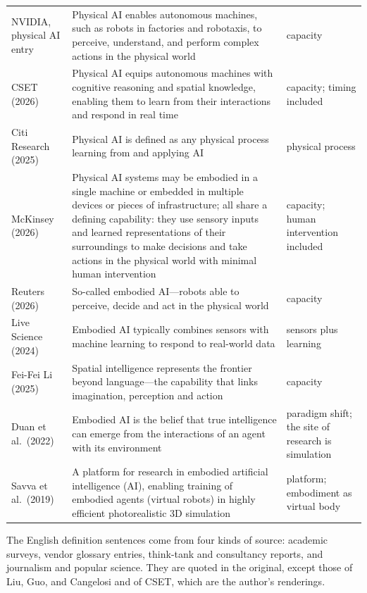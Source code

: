 \documentclass[10pt]{article}
\begin{document}
\begin{table}[htbp]
\begin{tabularx}{\textwidth}{>{\raggedright\arraybackslash}p{3.3cm}Y>{\raggedright\arraybackslash}p{2.6cm}}
NVIDIA, physical AI entry \cite{nvglossary} & Physical AI enables autonomous machines, such as robots in factories and robotaxis, to perceive, understand, and perform complex actions in the physical world & capacity \\
CSET (2026) \cite{cset2026} & Physical AI equips autonomous machines with cognitive reasoning and spatial knowledge, enabling them to learn from their interactions and respond in real time & capacity; timing included \\
Citi Research (2025) \cite{citi2025} & Physical AI is defined as any physical process learning from and applying AI & physical process \\
McKinsey (2026) \cite{mckinsey2026} & Physical AI systems may be embodied in a single machine or embedded in multiple devices or pieces of infrastructure; all share a defining capability: they use sensory inputs and learned representations of their surroundings to make decisions and take actions in the physical world with minimal human intervention & capacity; human intervention included \\
Reuters (2026) \cite{reuters2026} & So-called embodied AI---robots able to perceive, decide and act in the physical world & capacity \\
Live Science (2024) \cite{livescience2024} & Embodied AI typically combines sensors with machine learning to respond to real-world data & sensors plus learning \\
Fei-Fei Li (2025) \cite{feili2025} & Spatial intelligence represents the frontier beyond language---the capability that links imagination, perception and action & capacity \\
Duan et al.\ (2022) \cite{duan2022} & Embodied AI is the belief that true intelligence can emerge from the interactions of an agent with its environment & paradigm shift; the site of research is simulation \\
Savva et al.\ (2019) \cite{savva2019} & A platform for research in embodied artificial intelligence (AI), enabling training of embodied agents (virtual robots) in highly efficient photorealistic 3D simulation & platform; embodiment as virtual body \\
\bottomrule
\end{tabularx}
\end{table}

The English definition sentences come from four kinds of source: academic surveys, vendor glossary entries, think-tank and consultancy reports, and journalism and popular science. They are quoted in the original, except those of Liu, Guo, and Cangelosi and of CSET, which are the author's renderings.
\end{document}
